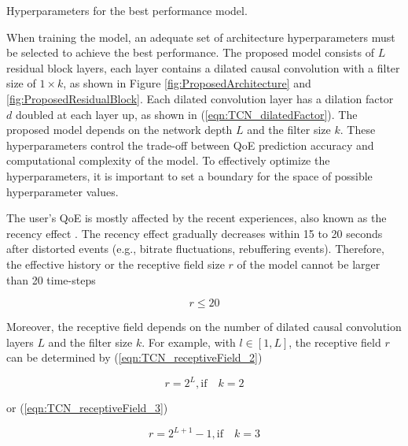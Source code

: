 \begin{table}[t]
  \caption{Hyperparameters for the best performance model.}
  \label{tbl:ModelHyperparameters}
  \centering
  
\end{table}

When training the model, an adequate set of architecture hyperparameters must be selected to achieve the best performance.
The proposed model consists of $L$ residual block layers, each layer contains a dilated causal convolution with a filter size of $1 \times k$, as shown in Figure \ref{fig:ProposedArchitecture} and \ref{fig:ProposedResidualBlock}.
Each dilated convolution layer has a dilation factor $d$ doubled at each layer up, as shown in (\ref{eqn:TCN_dilatedFactor}).
The proposed model depends on the network depth $L$ and the filter size $k$.
These hyperparameters control the trade-off between QoE prediction accuracy and computational complexity of the model.
To effectively optimize the hyperparameters, it is important to set a boundary for the space of possible hyperparameter values.

The user's QoE is mostly affected by the recent experiences, also known as the recency effect \cite{Recency, NetflixQoE, LFOVIA}.
The recency effect gradually decreases within 15 to 20 seconds \cite{NetflixQoE, LFOVIA} after distorted events (e.g., bitrate fluctuations, rebuffering events).
Therefore, the effective history or the receptive field size $r$ of the model cannot be larger than 20 time-steps

\begin{equation}
  r \leq 20
  \label{eqn:TCN_receptiveField_limit}
\end{equation}

Moreover, the receptive field depends on the number of dilated causal convolution layers $L$ and the filter size $k$.
For example, with $l \in [1, L]$, the receptive field $r$ can be determined by (\ref{eqn:TCN_receptiveField_2}) \cite{Network_Wavenet, Network_TCN}

\begin{equation}
 r = 2^{L} \mathrm{, if} \quad k = 2
 \label{eqn:TCN_receptiveField_2}
\end{equation}

or (\ref{eqn:TCN_receptiveField_3}) \cite{Network_ReceptiveField_3}

\begin{equation}
  r = 2^{L + 1} - 1 \mathrm{, if} \quad k = 3
  \label{eqn:TCN_receptiveField_3}
\end{equation}

